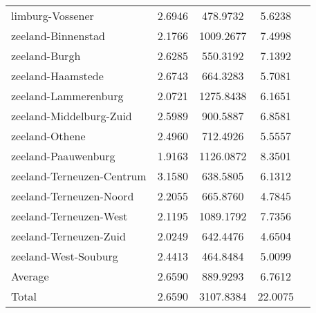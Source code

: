 \begin{longtable}{llccc}
limburg-Vossener & 2.6946 & 478.9732 & 5.6238 \\
zeeland-Binnenstad & 2.1766 & 1009.2677 & 7.4998 \\
zeeland-Burgh & 2.6285 & 550.3192 & 7.1392 \\
zeeland-Haamstede & 2.6743 & 664.3283 & 5.7081 \\
zeeland-Lammerenburg & 2.0721 & 1275.8438 & 6.1651 \\
zeeland-Middelburg-Zuid & 2.5989 & 900.5887 & 6.8581 \\
zeeland-Othene & 2.4960 & 712.4926 & 5.5557 \\
zeeland-Paauwenburg & 1.9163 & 1126.0872 & 8.3501 \\
zeeland-Terneuzen-Centrum & 3.1580 & 638.5805 & 6.1312 \\
zeeland-Terneuzen-Noord & 2.2055 & 665.8760 & 4.7845 \\
zeeland-Terneuzen-West & 2.1195 & 1089.1792 & 7.7356 \\
zeeland-Terneuzen-Zuid & 2.0249 & 642.4476 & 4.6504 \\
zeeland-West-Souburg & 2.4413 & 464.8484 & 5.0099 \\
Average & 2.6590 & 889.9293 & 6.7612 \\
Total & 2.6590 & 3107.8384 & 22.0075 \\
\hline
\end{longtable}
